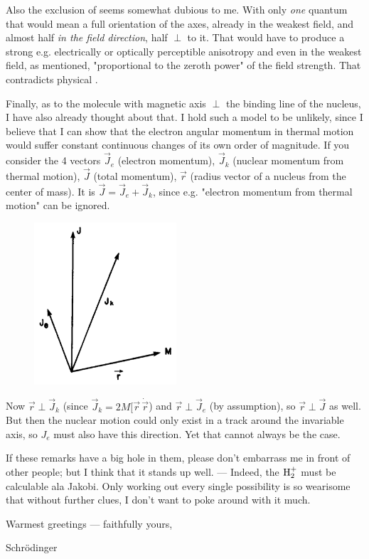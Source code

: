 \begin{letter}{8}
Also the exclusion of  seems somewhat dubious to me. With only \textit{one} quantum that would mean a full orientation of the axes, already in the weakest field, and almost half \textit{in the field direction}, half $\perp$ to it. That would have to produce a strong e.g. electrically or optically perceptible anisotropy and even in the weakest field, as mentioned, "proportional to the zeroth power" of the field strength. That contradicts physical .

Finally, as to the molecule with magnetic axis $\perp$ the binding line of the nucleus, I have also already thought about that. I hold such a model to be unlikely, since I believe that I can show that the electron angular momentum in thermal motion would suffer constant continuous changes of its own order of magnitude. If you consider the 4 vectors $\vec{J}_e$ (electron momentum), $\vec{J}_k$ (nuclear momentum from thermal motion), $\vec{J}$ (total momentum), $\vec{r}$ (radius vector of a nucleus from the center of mass). It is $\vec{J} = \vec{J}_e + \vec{J}_k$, since e.g. "electron momentum from thermal motion" can be ignored. 

\begin{figure}[h]
	\begin{center}
	\includegraphics[width=150pt]{08-19200712-01}
	\end{center}
\end{figure}

Now $\vec{r} \perp \vec{J}_k$ (since $\vec{J}_k = 2M[\vec{r}\, \dot{\vec{r}}$) and $\vec{r} \perp \vec{J}_e$ (by assumption), so $\vec{r}\perp\vec{J}$ as well. But then the nuclear motion could only exist in a track around the invariable axis, so $J_e$ must also have this direction. Yet that cannot always be the case.

If these remarks have a big hole in them, please don't embarrass me in front of other people; but I think that it stands up well. — Indeed, the $\text{H}_2^+$ must be calculable ala Jakobi. Only working out every single possibility is so wearisome that without further clues, I don't want to poke around with it much.

Warmest greetings — faithfully yours,

Schr\"odinger

\end{letter}